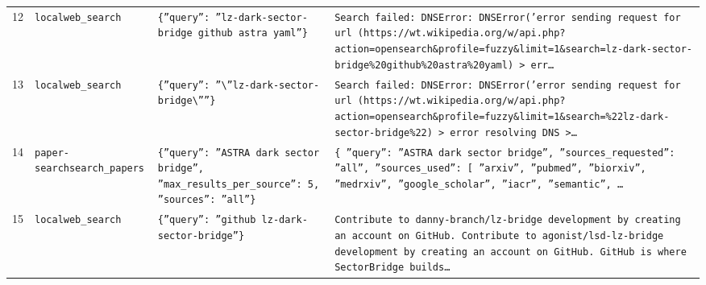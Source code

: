\documentclass[11pt,a4paper]{article}
\begin{document}
\begin{longtable}{@{}p{}p{}p{}p{}@{}}
12 & \texttt{local}\newline\texttt{web\_\allowbreak{}search} & \texttt{\{''query'':\allowbreak{} ''lz-dark-sector-bridge github astra yaml''\}\allowbreak{}} & \texttt{Search failed:\allowbreak{} DNSError:\allowbreak{} DNSError('error sending request for url (https:\allowbreak{}/\allowbreak{}/\allowbreak{}wt.wikipedia.org/\allowbreak{}w/\allowbreak{}api.php?action=\allowbreak{}opensearch\&profile=\allowbreak{}fuzzy\&limit=\allowbreak{}1\&search=\allowbreak{}lz-dark-sector-bridge\%20github\%20astra\%20yaml)\allowbreak{} \textgreater{}\allowbreak{} err\ldots{}\allowbreak{}} \\
13 & \texttt{local}\newline\texttt{web\_\allowbreak{}search} & \texttt{\{''query'':\allowbreak{} ''\textbackslash{}\allowbreak{}''lz-dark-sector-bridge\textbackslash{}\allowbreak{}''''\}\allowbreak{}} & \texttt{Search failed:\allowbreak{} DNSError:\allowbreak{} DNSError('error sending request for url (https:\allowbreak{}/\allowbreak{}/\allowbreak{}wt.wikipedia.org/\allowbreak{}w/\allowbreak{}api.php?action=\allowbreak{}opensearch\&profile=\allowbreak{}fuzzy\&limit=\allowbreak{}1\&search=\allowbreak{}\%22lz-dark-sector-bridge\%22)\allowbreak{} \textgreater{}\allowbreak{} error resolving DNS \textgreater{}\allowbreak{}\ldots{}\allowbreak{}} \\
14 & \texttt{paper-search}\newline\texttt{search\_\allowbreak{}papers} & \texttt{\{''query'':\allowbreak{} ''ASTRA dark sector bridge'',\allowbreak{} ''max\_\allowbreak{}results\_\allowbreak{}per\_\allowbreak{}source'':\allowbreak{} 5,\allowbreak{} ''sources'':\allowbreak{} ''all''\}\allowbreak{}} & \texttt{\{   ''query'':\allowbreak{} ''ASTRA dark sector bridge'',\allowbreak{}   ''sources\_\allowbreak{}requested'':\allowbreak{} ''all'',\allowbreak{}   ''sources\_\allowbreak{}used'':\allowbreak{} [     ''arxiv'',\allowbreak{}     ''pubmed'',\allowbreak{}     ''biorxiv'',\allowbreak{}     ''medrxiv'',\allowbreak{}     ''google\_\allowbreak{}scholar'',\allowbreak{}     ''iacr'',\allowbreak{}     ''semantic'',\allowbreak{}   \ldots{}\allowbreak{}} \\
15 & \texttt{local}\newline\texttt{web\_\allowbreak{}search} & \texttt{\{''query'':\allowbreak{} ''github lz-dark-sector-bridge''\}\allowbreak{}} & \texttt{Contribute to danny-branch/\allowbreak{}lz-bridge development by creating an account on GitHub. Contribute to agonist/\allowbreak{}lsd-lz-bridge development by creating an account on GitHub. GitHub is where SectorBridge builds\ldots{}\allowbreak{}} \\

\end{longtable}
\end{document}
